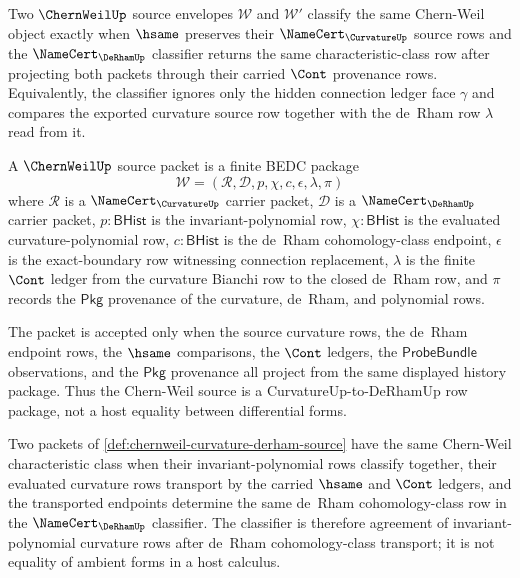 \begin{definition}
\label{def:chernweil-characteristic-classifier}
Two $\ChernWeilUp$ source envelopes $\mathcal{W}$ and $\mathcal{W}'$ classify the same Chern-Weil object exactly when $\hsame$ preserves their $\NameCert_{\CurvatureUp}$ source rows and the $\NameCert_{\DeRhamUp}$ classifier returns the same characteristic-class row after projecting both packets through their carried $\Cont$ provenance rows. Equivalently, the classifier ignores only the hidden connection ledger face $\gamma$ and compares the exported curvature source row together with the de~Rham row $\lambda$ read from it.
\end{definition}

\begin{definition}
\label{def:chernweil-curvature-derham-source}
A $\ChernWeilUp$ source packet is a finite BEDC package
$$
\mathcal{W}=(\mathcal{R},\mathcal{D},p,\chi,c,\epsilon,\lambda,\pi)
$$
where $\mathcal{R}$ is a $\NameCert_{\CurvatureUp}$ carrier packet, $\mathcal{D}$ is a $\NameCert_{\DeRhamUp}$ carrier packet, $p:\mathsf{BHist}$ is the invariant-polynomial row, $\chi:\mathsf{BHist}$ is the evaluated curvature-polynomial row, $c:\mathsf{BHist}$ is the de~Rham cohomology-class endpoint, $\epsilon$ is the exact-boundary row witnessing connection replacement, $\lambda$ is the finite $\Cont$ ledger from the curvature Bianchi row to the closed de~Rham row, and $\pi$ records the $\mathsf{Pkg}$ provenance of the curvature, de~Rham, and polynomial rows.

The packet is accepted only when the source curvature rows, the de~Rham endpoint rows, the $\hsame$ comparisons, the $\Cont$ ledgers, the $\mathsf{ProbeBundle}$ observations, and the $\mathsf{Pkg}$ provenance all project from the same displayed history package. Thus the Chern-Weil source is a CurvatureUp-to-DeRhamUp row package, not a host equality between differential forms.
\end{definition}

\begin{definition}
\label{def:chernweil-characteristic-class-classifier}
Two packets of \autoref{def:chernweil-curvature-derham-source} have the same Chern-Weil characteristic class when their invariant-polynomial rows classify together, their evaluated curvature rows transport by the carried $\hsame$ and $\Cont$ ledgers, and the transported endpoints determine the same de~Rham cohomology-class row in the $\NameCert_{\DeRhamUp}$ classifier. The classifier is therefore agreement of invariant-polynomial curvature rows after de~Rham cohomology-class transport; it is not equality of ambient forms in a host calculus.
\end{definition}

